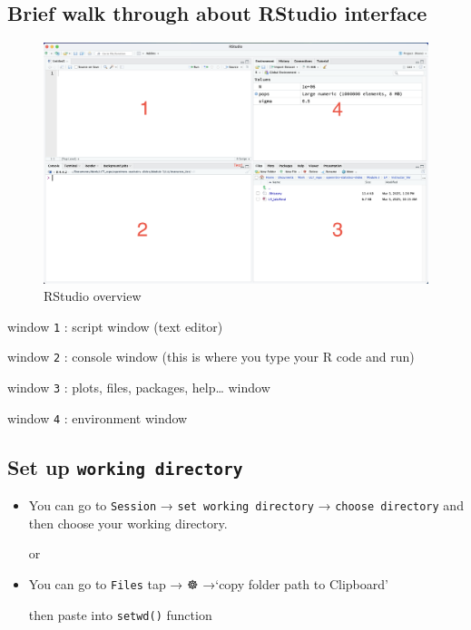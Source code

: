 \documentclass[
]{article}
\begin{document}
\subsection{Brief walk through about RStudio
interface}\label{brief-walk-through-about-rstudio-interface}

\begin{figure}
\centering
\includegraphics[width=7.98958in,height=\textheight,keepaspectratio]{lab1/images/Screen_Shot_Rstudio.png}
\caption{RStudio overview}
\end{figure}

window \texttt{1} : script window (text editor)

window \texttt{2} : console window (this is where you type your R code
and run)

window \texttt{3} : plots, files, packages, help\ldots{} window

window \texttt{4} : environment window

\subsection{\texorpdfstring{Set up
\texttt{working\ directory}}{Set up working directory}}\label{set-up-working-directory}

\begin{itemize}
\item
  You can go to \texttt{Session} → \texttt{set\ working\ directory} →
  \texttt{choose\ directory} and then choose your working directory.

  or
\item
  You can go to \texttt{Files} tap → ☸︎ →`copy folder path to Clipboard'

  then paste into \texttt{setwd()} function
\end{itemize}
\end{document}
